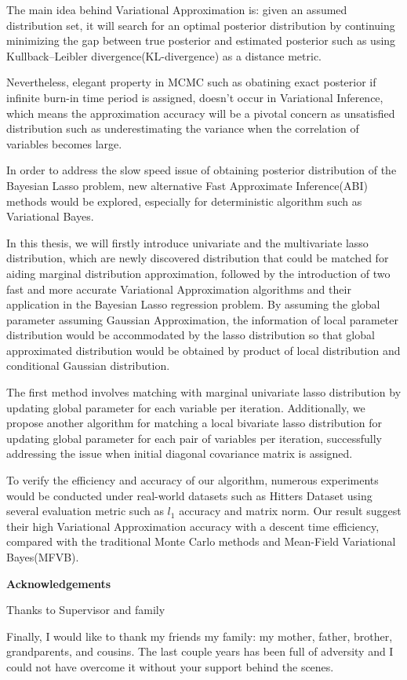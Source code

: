 The main idea behind Variational Approximation is: given an assumed distribution set, it will search for an optimal posterior distribution by continuing minimizing the gap between true posterior and estimated posterior such as using Kullback–Leibler divergence(KL-divergence) as a distance metric.

Nevertheless, elegant property in MCMC such as obatining exact posterior if infinite burn-in time period is assigned, doesn't occur in Variational Inference, which means the approximation accuracy will be a pivotal concern as unsatisfied distribution such as underestimating the variance when the correlation of variables becomes large. 

In order to address the slow speed issue of obtaining posterior distribution of the Bayesian Lasso problem, new alternative Fast Approximate Inference(ABI) methods would be explored, especially for deterministic algorithm such as Variational Bayes.

In this thesis, we will firstly introduce univariate and the multivariate lasso distribution, which are newly discovered distribution that could be matched for aiding marginal distribution approximation, followed by the introduction of two fast and more accurate Variational Approximation algorithms and their application in the Bayesian Lasso regression problem. By assuming the global parameter assuming Gaussian Approximation, the information of local parameter distribution would be accommodated by the lasso distribution so that global approximated distribution would be obtained by product of local distribution and conditional Gaussian distribution.


The first method involves matching with marginal univariate lasso distribution by updating global parameter for each variable per iteration. Additionally, we propose another algorithm for matching a local bivariate lasso distribution for updating global parameter for each pair of variables per iteration, successfully addressing the issue when initial diagonal covariance matrix is assigned.

To verify the efficiency and accuracy of our algorithm, numerous experiments would be conducted under real-world datasets such as Hitters Dataset using several evaluation metric such as $l_1$ accuracy and matrix norm.
Our result suggest their high Variational Approximation accuracy with a descent time efficiency, compared with the traditional Monte Carlo methods and Mean-Field Variational Bayes(MFVB).


\newpage

\begin{center}
    \textbf{\large Acknowledgements}\\
    \vspace{0.5cm}
\end{center}
   Thanks to Supervisor and family 

   Finally, I would like to thank my friends  my family: my mother, father, brother, grandparents, and cousins. The last couple years has been full of adversity and I could not have overcome it without your support behind the scenes.
   
\vfill
\hspace{0pt}
\pagebreak
\newpage